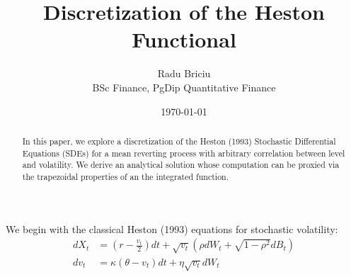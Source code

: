 \documentclass[letterpaper,11pt]{article}
\title{\textbf{Discretization of the Heston Functional}}
\author{\small Radu Briciu \vspace{-0.5em}  \\ \tiny BSc Finance, PgDip Quantitative Finance}
\date{\today}
\begin{document}
	
	\begin{titlepage}
		\maketitle
		\vfill
		\begin{abstract}
			In this paper, we explore a discretization of the Heston (1993) Stochastic Differential Equations (SDEs) for a mean reverting process with arbitrary correlation between level and volatility. We derive an analytical solution whose computation can be proxied via the trapezoidal properties of an the integrated function.
		\end{abstract}
		\vfill
	\end{titlepage}
	
	We begin with the classical Heston (1993) equations for stochastic volatility:
	\begin{align}
		dX_t &= \left( r - \frac{v_t}{2} \right) dt + \sqrt{v_t} \left( \rho dW_t + \sqrt{1 - \rho^2} dB_t \right) \label{eq:level} \\
		dv_t &= \kappa (\theta - v_t) dt + \eta \sqrt{v_t} dW_t \label{eq:variance}
	\end{align}
	
\end{document}
